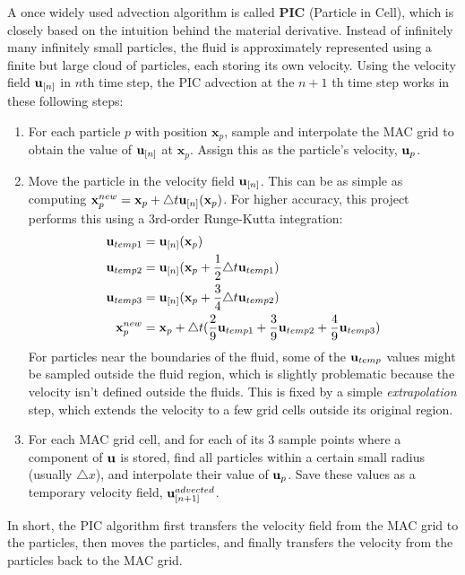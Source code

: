 A once widely used advection algorithm is called \textbf{PIC} (Particle in Cell), which is closely based on the intuition behind the material derivative. Instead of infinitely many infinitely small particles, the fluid is approximately represented using a finite but large cloud of particles, each storing its own velocity. Using the velocity field $\textbf{u}_{[n]}$ in $n$th time step, the PIC advection at the $n+1$ th time step works in these following steps: 

\begin{enumerate}
    \item For each particle $p$ with position $\textbf{x}_p$, sample and interpolate the MAC grid to obtain the value of $\textbf{u}_{[n]}$ at $\textbf{x}_p$. Assign this as the particle's velocity,  $\textbf{u}_p$.
    
    \item Move the particle in the velocity field $\textbf{u}_{[n]}$. This can be as simple as computing $\textbf{x}_p^{new} = \textbf{x}_p + \triangle t \textbf{u}_{[n]}(\textbf{x}_p)$. For higher accuracy, this project performs this using a 3rd-order Runge-Kutta integration:
    \begin{equation*}
        \begin{aligned}
            \textbf{u}_{temp1} &= \textbf{u}_{[n]}(\textbf{x}_p) \\
            \textbf{u}_{temp2} &= \textbf{u}_{[n]}(\textbf{x}_p + \frac{1}{2}\triangle t \textbf{u}_{temp1}) \\
            \textbf{u}_{temp3} &= \textbf{u}_{[n]}(\textbf{x}_p + \frac{3}{4}\triangle t \textbf{u}_{temp2})\\
            \textbf{x}_p^{new} &=  \textbf{x}_p + \triangle t(
                \frac{2}{9}\textbf{u}_{temp1} + \frac{3}{9}\textbf{u}_{temp2} + \frac{4}{9}\textbf{u}_{temp3}
                )
        \end{aligned}
    \end{equation*}
    For particles near the boundaries of the fluid, some of the $\textbf{u}_{temp}$ values might be sampled outside the fluid region, which is slightly problematic because the velocity isn't defined outside the fluids. This is fixed by a simple \textit{extrapolation} step, which extends the velocity to a few grid cells outside its original region.
    
    
    \item For each MAC grid cell, and for each of its 3 sample points where a component of $\textbf{u}$ is stored, find all particles within a certain small radius (usually $\triangle x$), and interpolate their value of $\textbf{u}_p$. Save these values as a temporary velocity field, $\textbf{u}_{[n+1]}^{advected}$.
\end{enumerate}
In short, the PIC algorithm first transfers the velocity field from the MAC grid to the particles, then moves the particles, and finally transfers the velocity from the particles back to the MAC grid.



